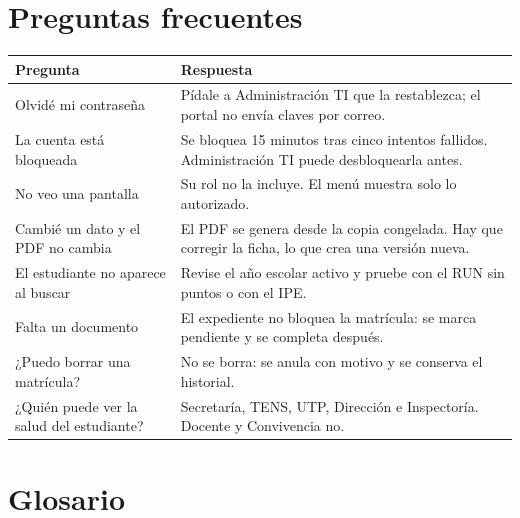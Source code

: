 \section{Preguntas frecuentes}

\begin{longtable}{@{}p{}p{}@{}}
\toprule
\textbf{Pregunta} & \textbf{Respuesta}\\
\midrule
Olvidé mi contraseña & Pídale a Administración TI que la restablezca; el
  portal no envía claves por correo.\\
La cuenta está bloqueada & Se bloquea 15 minutos tras cinco intentos
  fallidos. Administración TI puede desbloquearla antes.\\
No veo una pantalla & Su rol no la incluye. El menú muestra solo lo
  autorizado.\\
Cambié un dato y el PDF no cambia & El PDF se genera desde la copia
  congelada. Hay que corregir la ficha, lo que crea una versión nueva.\\
El estudiante no aparece al buscar & Revise el año escolar activo y pruebe
  con el RUN sin puntos o con el IPE.\\
Falta un documento & El expediente no bloquea la matrícula: se marca
  pendiente y se completa después.\\
¿Puedo borrar una matrícula? & No se borra: se anula con motivo y se conserva
  el historial.\\
¿Quién puede ver la salud del estudiante? & Secretaría, TENS, UTP, Dirección
  e Inspectoría. Docente y Convivencia no.\\
\bottomrule
\end{longtable}

\section{Glosario}

